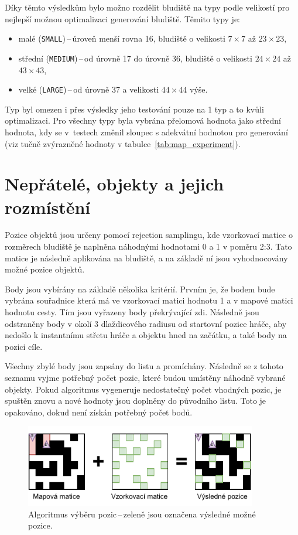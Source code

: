 Díky těmto výsledkům bylo možno rozdělit bludiště na typy podle velikostí pro nejlepší možnou optimalizaci generování bludiště. Těmito typy je:
\begin{itemize}
    \item  malé (\verb|SMALL|)\,--\,úroveň menší rovna 16, bludiště o velikosti $7 \times 7$ až $23 \times 23$,
    \item střední (\verb|MEDIUM|)\,--\,od úrovně 17 do úrovně 36, bludiště o velikosti $24 \times 24$ až $43 \times 43$,
    \item velké (\verb|LARGE|)\,--\,od úrovně 37 a velikosti $44 \times 44 $ výše.
\end{itemize}

Typ  byl omezen i přes výsledky jeho testování pouze na 1 typ a to kvůli optimalizaci. Pro všechny typy byla vybrána přelomová hodnota jako střední hodnota, kdy se v~testech změnil sloupec s adekvátní hodnotou pro generování (viz tučně zvýrazněné hodnoty v tabulce~\ref{tab:map_experiment}).

\section{Nepřátelé, objekty a jejich rozmístění}
Pozice objektů jsou určeny pomocí rejection samplingu, kde vzorkovací matice o rozměrech bludiště je naplněna náhodnými hodnotami 0 a 1 v poměru 2:3. Tato matice je následně aplikována na bludiště, a na základě ní jsou vyhodnocovány možné pozice objektů.

Body jsou vybírány na základě několika kritérií. Prvním je, že bodem bude vybrána souřadnice která má ve vzorkovací matici hodnotu 1 a v mapové matici hodnotu cesty. Tím jsou vyřazeny body překrývající zdi. Následně jsou odstraněny body v okolí 3 dlaždicového radiusu od startovní pozice hráče, aby nedošlo k instantnímu střetu hráče a objektu hned na začátku, a také body na pozici cíle. 

Všechny zbylé body jsou zapsány do listu a promíchány. Následně se z tohoto seznamu vyjme potřebný počet pozic, které budou umístěny náhodně vybrané objekty. Pokud algoritmus vygeneruje nedostatečný počet vhodných pozic, je spuštěn znovu a nové hodnoty jsou doplněny do původního listu. Toto je opakováno, dokud není získán potřebný počet bodů.

\begin{figure}[H]
    \centering
    \includegraphics[width=0.9\textwidth]{obrazky-figures/ch4/vyber_pozic.pdf}
    \caption{Algoritmus výběru pozic\,--\,zeleně jsou označena výsledné možné pozice.}
    \label{fig:vyber_pozic}
\end{figure}


